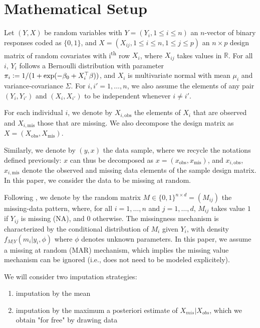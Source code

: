 \documentclass{article}
\begin{document}
\section{Mathematical Setup}

Let $(Y, X)$ be random variables with $Y=(Y_i, 1 \leq i\leq n)$ an $n$-vector of binary responses coded as $\{0, 1\}$, and $X = (X_{ij}, 1 \leq i \leq n, 1 \leq j \leq p)$ an $n\times p$ design matrix of random covariates with i\textsuperscript{th} row $X_i$, where $X_{ij}$ takes values in $\mathbb R$. For all $i$, $Y_i$ follows a Bernoulli distribution with parameter $\pi_{i} \vcentcolon = 1/(1+\exp(- \beta_0 + X_i^\top \beta))$, and $X_i$ is multivariate normal with mean $\mu_i$ and variance-covariance $\Sigma$. For $i, i'=1, \dots, n$, we also assume the elements of any 
pair $(Y_i, Y_{i'})$ and $(X_i, X_{i'})$ to be independent whenever $i\neq i'$.

For each individual $i$, we denote by $X_{i, \text{obs}}$ the elements of $X_i$ that are observed and $X_{i, \text{mis}}$ those that are missing. We also decompose the design matrix as $X=(X_{\text{obs}}, X_{\text{mis}})$.

Similarly, we denote by $(y, x)$ the data sample, where we recycle the notations defined previously: $x$ can thus be decomposed as  $x=(x_{\text{obs}}, x_{\text{mis}})$,  and $x_{i, \text{obs}}$, $x_{i, \text{mis}}$ denote the observed and missing data elements of the sample design matrix. In this paper, we consider the data to be missing at random. 

Following \textcite{little_statistical_2019}, we denote by the random matrix $M \in \{0, 1\}^{n\times d} = (M_{ij})$ the missing-data pattern, where, for all $i=1, \dots, n$ and $j=1,  \dots, d$,  $M_{ij}$ takes value $1$ if $Y_{ij}$ is missing (NA), and $0$ otherwise. The missingness mechanism is characterized by the conditional distribution of $M_i$ given $Y_i$, with density $f_{M|Y}(m_i|y_i, \phi)$ where $\phi$ denotes unknown parameters. In this paper, we assume a missing at random (MAR) mechanism, which implies the missing value mechanism can be ignored (i.e., does not need to be modeled explicitely). 

We will consider two imputation strategies:
\begin{enumerate}
    \item imputation by the mean
    \item imputation by the maximum a posteriori estimate of $X_{mis}|X_{obs}$, which we obtain "for free" by drawing data
\end{enumerate}
\end{document}

